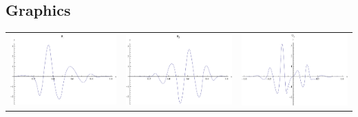 \documentclass{article}
\begin{document}
\begin{landscape}
\subsection{Graphics}
\begin{tabular}{ccc}
\includegraphics[width=6.7cm]{cubic_wavelet_1.pdf}& \includegraphics[width=6.7cm]{cubic_wavelet_2.pdf}& \includegraphics[width=6.7cm]{cubic_wavelet_3.pdf} \\

\end{tabular}
\end{landscape}
\end{document}
